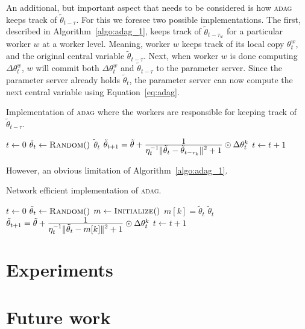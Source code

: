 An additional, but important aspect that needs to be considered is how \textsc{adag} keeps track of $\tilde{\theta}_{t - \tau}$. For this we foresee two possible implementations. The first, described in Algorithm~\ref{algo:adag_1}, keeps track of $\tilde{\theta}_{t - \tau_w}$ for a particular worker $w$ at a worker level. Meaning, worker $w$ keeps track of its local copy $\theta_t^w$, and the original central variable $\tilde{\theta}_{t-\tau}$. Next, when worker $w$ is done computing $\Delta\theta^w_t$, $w$ will commit both $\Delta\theta^w_t$ and $\tilde{\theta}_{t - \tau}$ to the parameter server. Since the parameter server already holds $\tilde{\theta}_{t}$, the parameter server can now compute the next central variable using Equation~\ref{eq:adag}.

\begin{algorithm}[H]
  \caption{Implementation of \textsc{adag} where the workers are responsible for keeping track of $\tilde{\theta}_{t - \tau}$.}
  \label{algo:adag_1}
  \begin{algorithmic}[1]
    \State $t \gets 0$ 
    \State $\tilde{\theta}_t \gets \Call{Random}$
    \State
     
    \State \Return $\tilde{\theta}_{t}$
    \EndProcedure
    \State
    \State $\tilde{\theta}_{t + 1} = \tilde{\theta} + \frac{\displaystyle 1}{\displaystyle \eta_t^{-1}\|\tilde{\theta}_t - \tilde{\theta}_{t - \tau_k}\|^2 + 1} \odot \Delta\theta^k_t$
    \State $t \gets t + 1$
    \EndProcedure
    \State
    \EndProcedure
  \end{algorithmic}
\end{algorithm}

However, an obvious limitation of Algorithm~\ref{algo:adag_1}.

\begin{algorithm}[H]
  \caption{Network efficient implementation of \textsc{adag}.}
  \label{algo:adag_2}
  \begin{algorithmic}[1]
    \State $t \gets 0$ 
    \State $\tilde{\theta}_t \gets \Call{Random}$
    \State $m \gets \Call{Initialize}$ 
    \State
     
    \State $m[k] = \tilde{\theta}_t$
    \State \Return $\tilde{\theta}_{t}$
    \EndProcedure
    \State
    \State $\tilde{\theta}_{t + 1} = \tilde{\theta} + \frac{\displaystyle 1}{\displaystyle \eta_t^{-1}\|\tilde{\theta}_t - m[k]\|^2 + 1} \odot \Delta\theta^k_t$
    \State $t \gets t + 1$
    \EndProcedure
    \State
    \EndProcedure
  \end{algorithmic}
\end{algorithm}

\section{Experiments}
\label{sec:adag_experiments}

\section{Future work}
\label{sec:adag_future_work}
